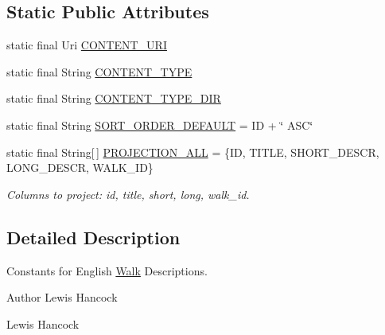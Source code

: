 \subsection*{Static Public Attributes}
\begin{DoxyCompactItemize}
\item 
static final Uri \hyperlink{classuk_1_1ac_1_1swan_1_1digitaltrails_1_1database_1_1_white_rock_contract_1_1_english_walk_descriptions_ac4d04ff3953fac590e30d090890632e0}{C\+O\+N\+T\+E\+N\+T\+\_\+\+U\+R\+I}
\item 
static final String \hyperlink{classuk_1_1ac_1_1swan_1_1digitaltrails_1_1database_1_1_white_rock_contract_1_1_english_walk_descriptions_afca9b10cbc3a532771e457c07678375d}{C\+O\+N\+T\+E\+N\+T\+\_\+\+T\+Y\+P\+E}
\item 
static final String \hyperlink{classuk_1_1ac_1_1swan_1_1digitaltrails_1_1database_1_1_white_rock_contract_1_1_english_walk_descriptions_a09798df19def55fa9e78bc38f7b281b4}{C\+O\+N\+T\+E\+N\+T\+\_\+\+T\+Y\+P\+E\+\_\+\+D\+I\+R}
\item 
static final String \hyperlink{classuk_1_1ac_1_1swan_1_1digitaltrails_1_1database_1_1_white_rock_contract_1_1_english_walk_descriptions_af6874dad863648dc025e8b159cd1102d}{S\+O\+R\+T\+\_\+\+O\+R\+D\+E\+R\+\_\+\+D\+E\+F\+A\+U\+L\+T} = I\+D + \char`\"{} A\+S\+C\char`\"{}
\item 
static final String\mbox{[}$\,$\mbox{]} \hyperlink{classuk_1_1ac_1_1swan_1_1digitaltrails_1_1database_1_1_white_rock_contract_1_1_english_walk_descriptions_af264cbc01a0211d25a73c457efea794b}{P\+R\+O\+J\+E\+C\+T\+I\+O\+N\+\_\+\+A\+L\+L} = \{I\+D, T\+I\+T\+L\+E, S\+H\+O\+R\+T\+\_\+\+D\+E\+S\+C\+R, L\+O\+N\+G\+\_\+\+D\+E\+S\+C\+R, W\+A\+L\+K\+\_\+\+I\+D\}
\begin{DoxyCompactList}\small\item\em Columns to project\+: id, title, short, long, walk\+\_\+id. \end{DoxyCompactList}\end{DoxyCompactItemize}


\subsection{Detailed Description}
Constants for English \hyperlink{classuk_1_1ac_1_1swan_1_1digitaltrails_1_1database_1_1_white_rock_contract_1_1_walk}{Walk} Descriptions. 

\begin{DoxyAuthor}{Author}
Lewis Hancock 

Lewis Hancock 
\end{DoxyAuthor}



